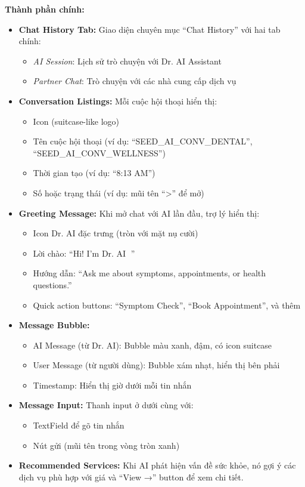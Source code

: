\textbf{Thành phần chính:}

\begin{itemize}
    \item \textbf{Chat History Tab:} Giao diện chuyên mục ``Chat History'' với hai tab chính:
    \begin{itemize}
        \item \textit{AI Session}: Lịch sử trò chuyện với Dr. AI Assistant
        \item \textit{Partner Chat}: Trò chuyện với các nhà cung cấp dịch vụ
    \end{itemize}
    
    \item \textbf{Conversation Listings:} Mỗi cuộc hội thoại hiển thị:
    \begin{itemize}
        \item Icon (suitcase-like logo)
        \item Tên cuộc hội thoại (ví dụ: ``SEED\_AI\_CONV\_DENTAL'', ``SEED\_AI\_CONV\_WELLNESS'')
        \item Thời gian tạo (ví dụ: ``8:13 AM'')
        \item Số hoặc trạng thái (ví dụ: mũi tên ``>'' để mở)
    \end{itemize}
    
    \item \textbf{Greeting Message:} Khi mở chat với AI lần đầu, trợ lý hiển thị:
    \begin{itemize}
        \item Icon Dr. AI đặc trưng (tròn với mặt nụ cười)
        \item Lời chào: ``Hi! I'm Dr. AI 👋''
        \item Hướng dẫn: ``Ask me about symptoms, appointments, or health questions.''
        \item Quick action buttons: ``Symptom Check'', ``Book Appointment'', và thêm
    \end{itemize}
    
    \item \textbf{Message Bubble:}
    \begin{itemize}
        \item AI Message (từ Dr. AI): Bubble màu xanh, đậm, có icon suitcase
        \item User Message (từ người dùng): Bubble xám nhạt, hiển thị bên phải
        \item Timestamp: Hiển thị giờ dưới mỗi tin nhắn
    \end{itemize}
    
    \item \textbf{Message Input:} Thanh input ở dưới cùng với:
    \begin{itemize}
        \item TextField để gõ tin nhắn
        \item Nút gửi (mũi tên trong vòng tròn xanh)
    \end{itemize}
    
    \item \textbf{Recommended Services:} Khi AI phát hiện vấn đề sức khỏe, nó gợi ý các dịch vụ phù hợp với giá và ``View →'' button để xem chi tiết.
\end{itemize}

